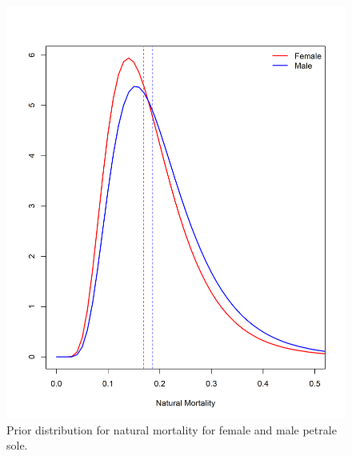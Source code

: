 \documentclass[12pt,]{article}
\begin{document}
\begin{figure}
\centering
\includegraphics{Figures/M_prior.png}
\caption{Prior distribution for natural mortality for female and male
petrale sole. \label{fig:m_prior}}
\end{figure}

\FloatBarrier
\end{document}
